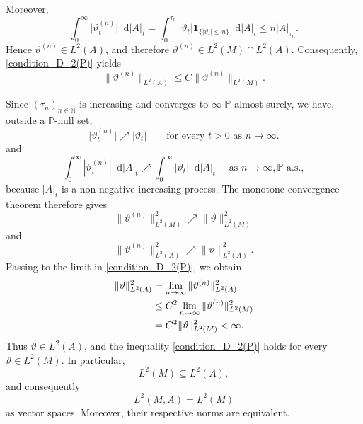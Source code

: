 \documentclass[11pt,a4paper,twoside,openany]{report}
\numberwithin{equation}{section}
\newcommand{\diff}{\mathop{}\!\mathrm{d}}
\theoremstyle{plain} %
\theoremstyle{definition} %
\theoremstyle{remark} %
\begin{document}
Moreover,
\begin{equation*}
    \int_0^\infty
    \big|\vartheta^{(n)}_t\big|\diff |A|_t
    =
    \int_0^{\tau_n}
    |\vartheta_t|
    \mathbf{1}_{\{|\vartheta_t|\leq n\}}
    \diff |A|_t\leq
    n|A|_{\tau_n}.
\end{equation*}
Hence \(\vartheta^{(n)}\in L^2(A)\), and therefore
\(\vartheta^{(n)}\in L^2(M)\cap L^2(A)\). Consequently,
\eqref{condition_D_2(P)} yields
\begin{equation*}
    \|\vartheta^{(n)}\|_{L^2(A)}
    \leq
    C\|\vartheta^{(n)}\|_{L^2(M)}.
\end{equation*}

Since \((\tau_n)_{n\in\mathbb{N}}\) is increasing and converges to
\(\infty\) \(\mathbb{P}\)-almost surely, we have, outside a \(\mathbb{P}\)-null set,
\begin{equation*}
    \big|\vartheta^{(n)}_t\big|
    \nearrow
    |\vartheta_t|
    \qquad
    \text{for every }t> 0\text{ as }n\to\infty.
\end{equation*}
and 
\begin{equation*}
    \int_0^\infty|\vartheta^{(n)}_t|\diff |A|_t
    \nearrow
    \int_0^\infty|\vartheta_t|\diff |A|_t
    \quad\text{ as }n\to\infty,\mathbb{P}\text{-a.s.},
\end{equation*}
because \(|A|_t\) is a non-negative increasing process.
The monotone convergence theorem therefore gives
\begin{equation*}
    \|\vartheta^{(n)}\|_{L^2(M)}^2
    \nearrow
    \|\vartheta\|_{L^2(M)}^2
\end{equation*}
and
\begin{equation*}
    \|\vartheta^{(n)}\|_{L^2(A)}^2
    \nearrow
    \|\vartheta\|_{L^2(A)}^2.
\end{equation*}
 Passing to the limit in
\eqref{condition_D_2(P)}, we obtain
\begin{align*}
    \|\vartheta\|_{L^2(A)}^2
    &=
    \lim_{n\to\infty}
    \|\vartheta^{(n)}\|_{L^2(A)}^2
    \notag\\
    &\leq
    C^2
    \lim_{n\to\infty}
    \|\vartheta^{(n)}\|_{L^2(M)}^2
    \notag\\& =
    C^2\|\vartheta\|_{L^2(M)}^2
    <
    \infty.
\end{align*}
Thus \(\vartheta\in L^2(A)\), and the inequality
\eqref{condition_D_2(P)} holds for every
\(\vartheta\in L^2(M)\). In particular,
\begin{equation*}
    L^2(M)\subseteq L^2(A),
\end{equation*}
and consequently
\begin{equation*}
    L^2(M,A)=L^2(M)
\end{equation*}
as vector spaces. Moreover, their respective norms are equivalent.
\end{document}
